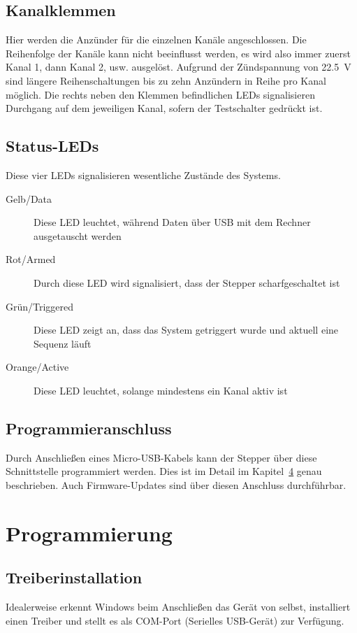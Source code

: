 \documentclass[paper=a4, open=any, numbers=noenddot]{scrbook}
\begin{document}
		\section{Kanalklemmen}
			Hier werden die Anzünder für die einzelnen Kanäle angeschlossen. Die Reihenfolge der Kanäle kann nicht beeinflusst werden, es wird also immer zuerst Kanal 1, dann Kanal 2, usw. ausgelöst. Aufgrund der Zündspannung von \SI{22,5}{\volt} sind längere Reihenschaltungen bis zu zehn Anzündern in Reihe pro Kanal möglich. Die rechts neben den Klemmen befindlichen LEDs signalisieren Durchgang auf dem jeweiligen Kanal, sofern der Testschalter gedrückt ist.

		\section{Status-LEDs}
			Diese vier LEDs signalisieren wesentliche Zustände des Systems.
			\begin{description}
				\item [Gelb/Data] Diese LED leuchtet, während Daten über USB mit dem Rechner ausgetauscht werden
				\item [Rot/Armed] Durch diese LED wird signalisiert, dass der Stepper scharfgeschaltet ist
				\item [Grün/Triggered] Diese LED zeigt an, dass das System getriggert wurde und aktuell eine Sequenz läuft
				\item [Orange/Active] Diese LED leuchtet, solange mindestens ein Kanal aktiv ist
			\end{description}

		\section{Programmieranschluss}
			Durch Anschließen eines Micro-USB-Kabels kann der Stepper über diese Schnittstelle programmiert werden. Dies ist im Detail im Kapitel~\ref{sec:gui} genau beschrieben. Auch Firmware-Updates sind über diesen Anschluss durchführbar.

	\chapter{Programmierung}
		\label{sec:gui}
		\section{Treiberinstallation}
			Idealerweise erkennt Windows beim Anschließen das Gerät von selbst, installiert einen Treiber und stellt es als COM-Port (Serielles USB-Gerät) zur Verfügung.
\end{document}
